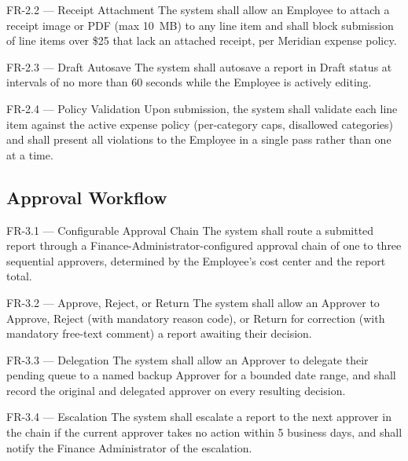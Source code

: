 \begin{reqbox}{FR-2.2 --- Receipt Attachment}
The system shall allow an Employee to attach a receipt image or PDF (max 10~MB) to any line
item and shall block submission of line items over \$25 that lack an attached receipt, per
Meridian expense policy. \hfill \priohigh
\end{reqbox}

\begin{reqbox}{FR-2.3 --- Draft Autosave}
The system shall autosave a report in Draft status at intervals of no more than 60 seconds
while the Employee is actively editing. \hfill \priomed
\end{reqbox}

\begin{reqbox}{FR-2.4 --- Policy Validation}
Upon submission, the system shall validate each line item against the active expense policy
(per-category caps, disallowed categories) and shall present all violations to the Employee
in a single pass rather than one at a time. \hfill \priohigh
\end{reqbox}

\subsection{Approval Workflow}

\begin{reqbox}{FR-3.1 --- Configurable Approval Chain}
The system shall route a submitted report through a Finance-Administrator-configured approval
chain of one to three sequential approvers, determined by the Employee's cost center and the
report total. \hfill \priohigh
\end{reqbox}

\begin{reqbox}{FR-3.2 --- Approve, Reject, or Return}
The system shall allow an Approver to Approve, Reject (with mandatory reason code), or Return
for correction (with mandatory free-text comment) a report awaiting their decision. \hfill \priohigh
\end{reqbox}

\begin{reqbox}{FR-3.3 --- Delegation}
The system shall allow an Approver to delegate their pending queue to a named backup Approver
for a bounded date range, and shall record the original and delegated approver on every
resulting decision. \hfill \priomed
\end{reqbox}

\begin{reqbox}{FR-3.4 --- Escalation}
The system shall escalate a report to the next approver in the chain if the current approver
takes no action within 5 business days, and shall notify the Finance Administrator of the
escalation. \hfill \priomed
\end{reqbox}

